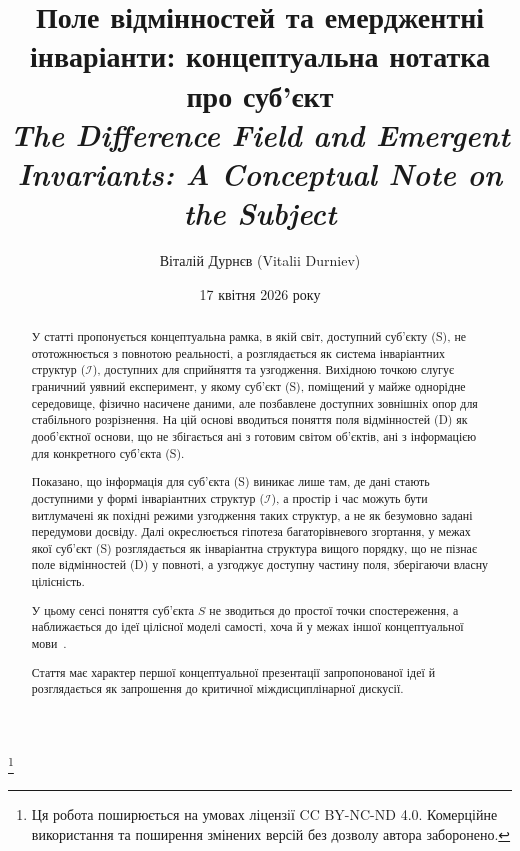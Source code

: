 \documentclass[aps,prd,onecolumn,nofootinbib,superscriptaddress]{revtex4-2}
\begin{document}
\title{%
Поле відмінностей та емерджентні інваріанти: концептуальна нотатка про суб’єкт\\
{\large\itshape The Difference Field and Emergent Invariants: A Conceptual Note on the Subject}
}
\thanks{Ця робота поширюється на умовах ліцензії CC BY-NC-ND 4.0. Комерційне використання та поширення змінених версій без дозволу автора заборонено.}
\author{Віталій Дурнєв (Vitalii Durniev)}

\date{17 квітня 2026 року}

\begin{abstract}
У статті пропонується концептуальна рамка, в якій світ, доступний суб’єкту (S), не ототожнюється з повнотою реальності, а розглядається як система інваріантних структур ($\mathcal{I}$), доступних для сприйняття та узгодження. Вихідною точкою слугує граничний уявний експеримент, у якому суб’єкт (S), поміщений у майже однорідне середовище, фізично насичене даними, але позбавлене доступних зовнішніх опор для стабільного розрізнення. На цій основі вводиться поняття поля відмінностей (D) як дооб’єктної основи, що не збігається ані з готовим світом об’єктів, ані з інформацією для конкретного суб’єкта (S).

Показано, що інформація для суб’єкта (S) виникає лише там, де дані стають доступними у формі інваріантних структур ($\mathcal{I}$), а простір і час можуть бути витлумачені як похідні режими узгодження таких структур, а не як безумовно задані передумови досвіду. Далі окреслюється гіпотеза багаторівневого згортання, у межах якої суб’єкт (S) розглядається як інваріантна структура вищого порядку, що не пізнає поле відмінностей (D) у повноті, а узгоджує доступну частину поля, зберігаючи власну цілісність.

У цьому сенсі поняття суб’єкта \(S\) не зводиться до простої точки спостереження, а наближається до ідеї цілісної моделі самості, хоча й у межах іншої концептуальної мови~\cite{Metzinger2003}.

Стаття має характер першої концептуальної презентації запропонованої ідеї й розглядається як запрошення до критичної міждисциплінарної дискусії.
\end{abstract}

\maketitle
\end{document}
